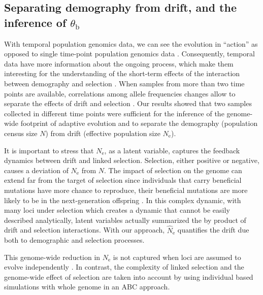 \documentclass[a4paper, 12pt]{article}
\begin{document}
\subsection*{Separating demography from drift, and the inference of $\theta_{\mathrm{b}}$}

With temporal population genomics data, we can see the evolution in ``action'' as opposed to single time-point population genomics data \citep{Feder:2021bt}. Consequently, temporal data have more information about the ongoing process, which make them interesting for the understanding of the short-term effects of the interaction between demography and selection \citep{Buffalo:2019ab, Dehasque:2020ku, Williams:2020gk}. When samples from more than two time points are available, correlations among allele frequencies changes allow to separate the effects of drift and selection \citep[e.g.,][]{Buffalo:2020hq,Feder:2014fe}. Our results showed that two samples collected in different time points were sufficient for the inference of the genome-wide footprint of adaptive evolution and to separate the demography (population census size $N$) from drift (effective population size $N_{\mathrm{e}}$). 

It is important to stress that $N_{\mathrm{e}}$, as a latent variable, captures the feedback dynamics between drift and linked selection. Selection, either positive or negative, causes a deviation of $N_\mathrm{e}$ from $N$. The impact of selection on the genome can extend far from the target of selection since individuals that carry beneficial mutations have more chance to reproduce, their beneficial mutations are more likely to be in the next-generation offspring  \citep{Walsh:2018tv}. In this complex dynamic, with many loci under selection which creates a dynamic that cannot be easily described analytically, latent variables actually summarized the by product of drift and selection interactions. With our approach, $\hat N_\mathrm{e}$ quantifies the drift due both to demographic and selection processes.

This genome-wide reduction in $N_{\mathrm{e}}$ is not captured when loci are assumed to evolve independently \citep[as in][for example]{Sheehan:2016caa}. In contrast, the complexity of linked selection and the genome-wide effect of selection are taken into account by using individual based simulations with whole genome in an ABC approach. 
\end{document}
